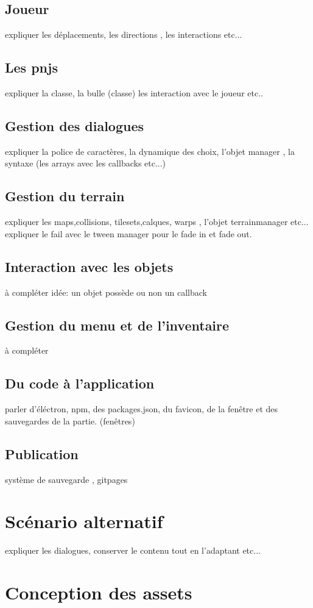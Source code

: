 \documentclass[11pt]{article}
\begin{document}
\subsection{Joueur}
expliquer les déplacements, les directions , les interactions etc...
\subsection{Les pnjs}
expliquer la classe, la bulle (classe) 
les interaction avec le joueur etc..
\subsection{Gestion des dialogues}
expliquer la police de caractères, la dynamique des choix, l'objet manager , la syntaxe (les arrays avec les callbacks etc...)
\subsection{Gestion du terrain}
expliquer les maps,collisions, tilesets,calques, warps , l'objet terrainmanager etc... expliquer le fail avec le tween manager pour le fade in et fade out.
\subsection{Interaction avec les objets}
à compléter idée: un objet possède ou non un callback 
\subsection{Gestion du menu et de l'inventaire}
à compléter
\subsection{Du code à l'application}
parler d'éléctron, npm, des packages.json, du favicon, de la fenêtre et des sauvegardes de la partie. (fenêtres)

\subsection{Publication}
système de sauvegarde , gitpages
\section{Scénario alternatif}
expliquer les dialogues, conserver le contenu tout en l'adaptant etc...
\section{Conception des assets}
\end{document}
